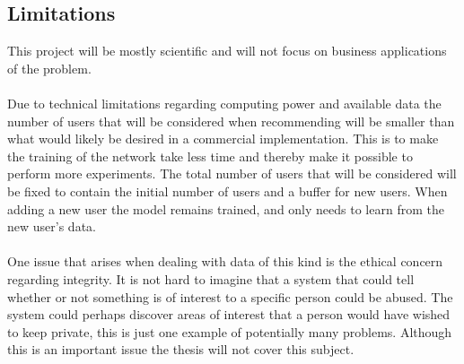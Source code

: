 \subsection{Limitations}
This project will be mostly scientific and will not focus on business applications of the problem.
\\\\
Due  to  technical  limitations  regarding  computing  power  and  available  data  the number of users that will be considered when recommending will be smaller than what would likely be desired in a commercial implementation. This  is  to  make  the  training  of  the  network  take  less  time  and  thereby make it possible to perform more experiments. The total number of users that will be considered will be fixed to contain the initial number of users and a buffer for new users. When adding a new user the model remains trained, and only needs to learn from the new user’s data.
\\\\
One issue that arises when dealing with data of this kind is the ethical concern regarding integrity. It is not hard to imagine that a system that could tell whether or not something is of interest to a specific person could be abused. The system could perhaps discover areas of interest that a person would have wished to keep private, this is just one example of potentially many problems. Although this is an important issue the thesis will not cover this subject. 
